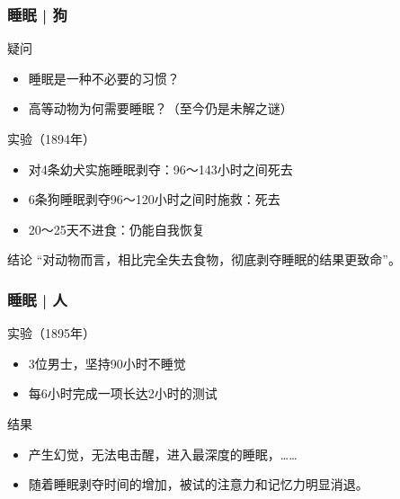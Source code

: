 \begin{frame}
  \frametitle{睡眠 | 狗}
  \begin{block}{疑问}
    \begin{itemize}
      \item 睡眠是一种不必要的习惯？
      \item 高等动物为何需要睡眠？（至今仍是未解之谜）
    \end{itemize}
  \end{block}
  \pause
  \begin{block}{实验（1894年）}
    \begin{itemize}
      \item 对4条幼犬实施睡眠剥夺：96～143小时之间死去
      \item 6条狗睡眠剥夺96～120小时之间时施救：死去
      \item 20～25天不进食：仍能自我恢复
    \end{itemize}
  \end{block}
  \pause
  \begin{block}{结论}
    “对动物而言，\alert{相比完全失去食物，彻底剥夺睡眠的结果更致命}”。
  \end{block}
\end{frame}

\begin{frame}
  \frametitle{睡眠 | 人}
  \begin{block}{实验（1895年）}
    \begin{itemize}
      \item 3位男士，坚持90小时不睡觉
      \item 每6小时完成一项长达2小时的测试
    \end{itemize}
  \end{block}
  \pause
  \begin{block}{结果}
    \begin{itemize}
      \item 产生幻觉，无法电击醒，进入最深度的睡眠，……
      \item \alert{随着睡眠剥夺时间的增加，被试的注意力和记忆力明显消退。}
    \end{itemize}
  \end{block}
\end{frame}

